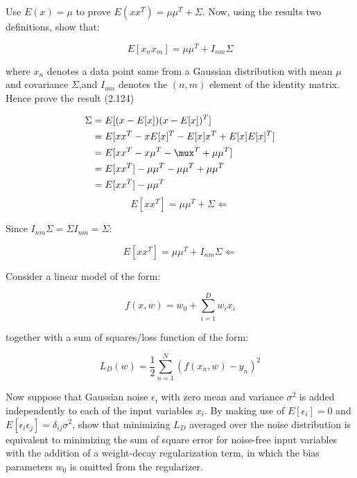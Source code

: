 \documentclass{homework}
\begin{document}
\newpage
\begin{problem}[2]
    Use $E(x) = \mu$ to prove $E(xx^T)=\mu\mu^T+\Sigma$. Now, using the results two definitions, show that:
    
    $$
    E[x_n x_m] = \mu\mu^T + I_{nm}\Sigma
    $$

    where $x_n$ denotes a data point same from a Gaussian distribution with mean $\mu$ and covariance $\Sigma$,and $I_{nm}$ denotes the $(n,m)$ element of the identity matrix. Hence prove the result (2.124)
\end{problem}

\begin{solution}
    \begin{equation*}
        \begin{split}
            \Sigma   & = E[(x-E[x])(x-E[x])^T ] \\
                & = E[xx^T-xE[x]^T - E[x]x^T + E[x]E[x]^T] \\
                & = E[xx^T - x\mu^T -\mux^T +\mu\mu^T] \\
                & = E[xx^T] - \mu\mu^T -\mu\mu^T + \mu\mu^T \\
                & = E[xx^T] - \mu\mu^T
        \end{split}
    \end{equation*}
    \begin{equation*}
        E[xx^T] = \mu\mu^T + \Sigma \Leftarrow
    \end{equation*}

    Since $I_{nm}\Sigma = \Sigma I_{nm} = \Sigma$: 

    \begin{equation*}
        E[xx^T] = \mu\mu^T+I_{nm}\Sigma \Leftarrow
    \end{equation*}
\end{solution}
\newpage
\begin{problem}[3]
    Consider a linear model of the form:

    $$
    f(x,w) = w_0 + \sum_{i=1}^D w_i x_i
    $$

    together with a sum of squares/loss function of the form:

    $$
    L_D(w) = \frac{1}{2} \sum_{n=1}^{N} (f(x_n,w)-y_n)^2
    $$

    Now suppose that Gaussian noise $\epsilon_i$ with zero mean and variance $\sigma^2$ is added independently to each of the input variables $x_i$. By making use of $E[\epsilon_i]=0$ and $E[\epsilon_i \epsilon_j]=\delta_{ij}\sigma^2$, show that minimizing $L_D$ averaged over the noise distribution is equivalent to minimizing the sum of square error for noise-free input variables with the addition of a weight-decay regularization term, in which the bias parameters $w_0$ is omitted from the regularizer.
\end{problem}
\end{document}
